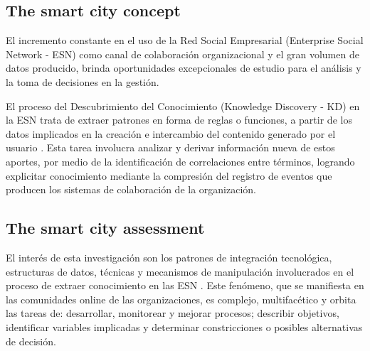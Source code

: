 \documentclass[a4paper,fleqn,spanish]{cas-dc}
\begin{document}
\subsection{The smart city concept}\label{concepto}


El incremento constante en el uso de la Red Social Empresarial (Enterprise
Social Network - ESN) \cite{aljowder_systematic_2019} como canal de colaboración
organizacional y el gran volumen de datos producido, brinda oportunidades
excepcionales de estudio para el análisis y la toma de decisiones en la gestión.

El proceso del Descubrimiento del Conocimiento (Knowledge Discovery - KD) en la
ESN trata de extraer patrones en forma de reglas o funciones, a partir de los
datos implicados en la creación e intercambio del contenido generado por el
usuario \cite{wahab_systematic_2020}. Esta tarea involucra analizar y derivar información
nueva de estos aportes, por medio de la identificación de correlaciones entre
términos, logrando explicitar conocimiento mediante la compresión del registro
de eventos que producen los sistemas de colaboración de la organización.

\subsection{ The smart city assessment}\label{afirmacion}

El interés de esta investigación son los patrones de integración tecnológica,
estructuras de datos, técnicas y mecanismos de manipulación involucrados en el
proceso de extraer conocimiento en las ESN \cite{stubinger_understanding_2020}. Este
fenómeno, que se manifiesta en las comunidades online de las organizaciones, es
complejo, multifacético y orbita las tareas de: desarrollar, monitorear y
mejorar procesos; describir objetivos, identificar variables implicadas y
determinar constricciones o posibles alternativas de decisión.

\end{document}
